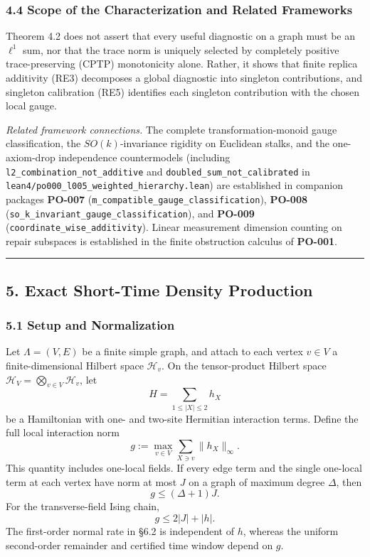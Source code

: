 \documentclass[
  11pt,
]{article}
\begin{document}
\subsubsection{4.4 Scope of the Characterization and Related Frameworks}\label{scope-of-the-characterization-and-related-frameworks}

Theorem 4.2 does not assert that every useful diagnostic on a graph must be an \(\ell^1\) sum, nor that the trace norm is uniquely selected by completely positive trace-preserving (CPTP) monotonicity alone. Rather, it shows that finite replica additivity (RE3) decomposes a global diagnostic into singleton contributions, and singleton calibration (RE5) identifies each singleton contribution with the chosen local gauge.

\emph{Related framework connections.} The complete transformation-monoid gauge classification, the \(SO(k)\)-invariance rigidity on Euclidean stalks, and the one-axiom-drop independence countermodels (including \texttt{l2\_combination\_not\_additive} and \texttt{doubled\_sum\_not\_calibrated} in \texttt{lean4/po000\_l005\_weighted\_hierarchy.lean}) are established in companion packages \textbf{PO-007} (\texttt{m\_compatible\_gauge\_classification}), \textbf{PO-008} (\texttt{so\_k\_invariant\_gauge\_classification}), and \textbf{PO-009} (\texttt{coordinate\_wise\_additivity}). Linear measurement dimension counting on repair subspaces is established in the finite obstruction calculus of \textbf{PO-001}.

\begin{center}\rule{0.5\linewidth}{0.5pt}\end{center}

\subsection{5. Exact Short-Time Density Production}\label{exact-short-time-density-production}

\subsubsection{5.1 Setup and Normalization}\label{setup-and-normalization}

Let \(\Lambda=(V,E)\) be a finite simple graph, and attach to each vertex \(v\in V\) a finite-dimensional Hilbert space \(\mathcal H_v\). On the tensor-product Hilbert space \(\mathcal H_V = \bigotimes_{v\in V}\mathcal H_v\), let
\[
H=\sum_{1\le |X|\le2}h_X
\]
be a Hamiltonian with one- and two-site Hermitian interaction terms. Define the full local interaction norm
\[
g:=\max_{v\in V}\sum_{X\ni v}\lVert h_X\rVert_\infty.
\]
This quantity includes one-local fields. If every edge term and the single one-local term at each vertex have norm at most \(J\) on a graph of maximum degree \(\Delta\), then
\[
g\le(\Delta+1)J.
\]
For the transverse-field Ising chain,
\[
g\le2|J|+|h|.
\]
The first-order normal rate in §6.2 is independent of \(h\), whereas the uniform second-order remainder and certified time window depend on \(g\).
\end{document}
